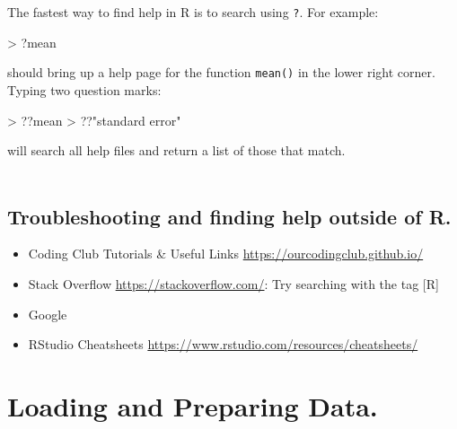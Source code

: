 \documentclass[a4paper,12pt]{article}
\begin{document}
The fastest way to find help in R is to search using \texttt{?}. For example:

\begin{shaded}
\begin{Schunk}
\begin{Sinput}
> ?mean
\end{Sinput}
\end{Schunk}
\end{shaded}

should bring up a help page for the function \texttt{mean()} in the lower right corner. Typing two question marks: 

\begin{shaded}
\begin{Schunk}
\begin{Sinput}
> ??mean
> ??"standard error"
\end{Sinput}
\end{Schunk}
\end{shaded}

will search all help files and return a list of those that match. \\\\



\subsection {Troubleshooting and finding help outside of R.}

\begin{itemize}
\item Coding Club Tutorials \& Useful Links \url{https://ourcodingclub.github.io/}
\item Stack Overflow \url{https://stackoverflow.com/}: Try searching with the tag [R]
\item Google
\item RStudio Cheatsheets \url{https://www.rstudio.com/resources/cheatsheets/}
\end{itemize}


\section {Loading and Preparing Data.}
\end{document}
